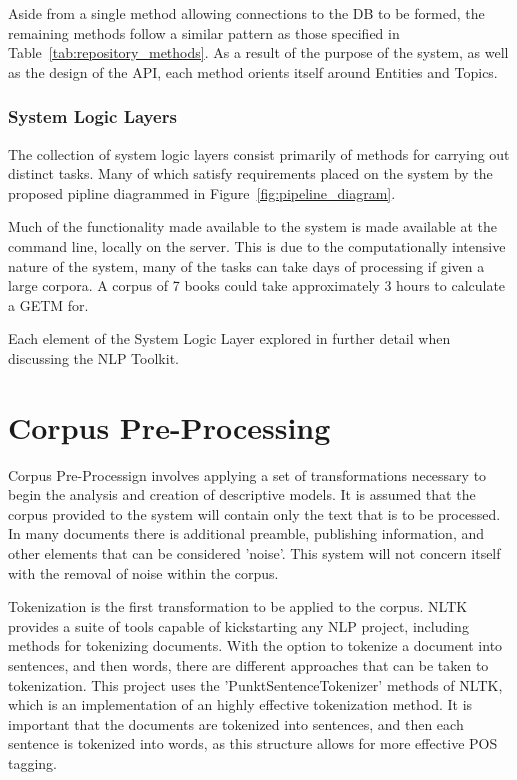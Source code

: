\documentclass[10pt]{report}
\begin{document}
Aside from a single method allowing connections to the DB to be formed, the remaining methods follow a similar pattern as those specified in Table~\ref{tab:repository_methods}. As a result of the purpose of the system, as well as the design of the API, each method orients itself around Entities and Topics.

\subsubsection{System Logic Layers}
The collection of system logic layers consist primarily of methods for carrying out distinct tasks. Many of which satisfy requirements placed on the system by the proposed pipline diagrammed in Figure~\ref{fig:pipeline_diagram}.

Much of the functionality made available to the system is made available at the command line, locally on the server. This is due to the computationally intensive nature of the system, many of the tasks can take days of processing if given a large corpora. A corpus of 7 books could take approximately 3 hours to calculate a GETM for.

Each element of the System Logic Layer explored in further detail when discussing the NLP Toolkit.


\section{Corpus Pre-Processing}

Corpus Pre-Processign involves applying a set of transformations necessary to begin the analysis and creation of descriptive models. It is assumed that the corpus provided to the system will contain only the text that is to be processed. In many documents there is additional preamble, publishing information, and other elements that can be considered 'noise'. This system will not concern itself with the removal of noise within the corpus.

Tokenization is the first transformation to be applied to the corpus. NLTK provides a suite of tools capable of kickstarting any NLP project, including methods for tokenizing documents. With the option to tokenize a document into sentences, and then words, there are different approaches that can be taken to tokenization. This project uses the 'PunktSentenceTokenizer' methods of NLTK, which is an implementation of an highly effective tokenization method.\cite{Kiss2006-cm} It is important that the documents are tokenized into sentences, and then each sentence is tokenized into words, as this structure allows for more effective POS tagging.
\end{document}
